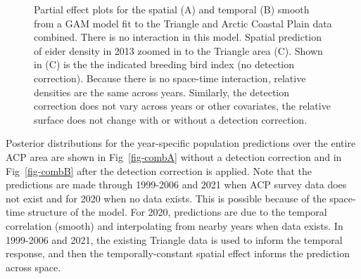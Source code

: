 \documentclass[
  10pt,
  letterpaper,
]{article}
\begin{document}
\begin{figure}

\begin{minipage}{0.50\linewidth}

\subcaption{\label{fig-combPart}}

\end{minipage}%
%
\begin{minipage}{0.50\linewidth}

\subcaption{\label{fig-temp}}

\end{minipage}%
\newline
\begin{minipage}{\linewidth}

\subcaption{\label{fig-combZoom}}

\end{minipage}%

\caption{\label{fig-mapComb}Partial effect plots for the spatial (A) and
temporal (B) smooth from a GAM model fit to the Triangle and Arctic
Coastal Plain data combined. There is no interaction in this model.
Spatial prediction of eider density in 2013 zoomed in to the Triangle
area (C). Shown in (C) is the the indicated breeding bird index (no
detection correction). Because there is no space-time interaction,
relative densities are the same across years. Similarly, the detection
correction does not vary across years or other covariates, the relative
surface does not change with or without a detection correction.}

\end{figure}%

Posterior distributions for the year-specific population predictions
over the entire ACP area are shown in Fig~\ref{fig-combA} without a
detection correction and in Fig~\ref{fig-combB} after the detection
correction is applied. Note that the predictions are made through
1999-2006 and 2021 when ACP survey data does not exist and for 2020 when
no data exists. This is possible because of the space-time structure of
the model. For 2020, predictions are due to the temporal correlation
(smooth) and interpolating from nearby years when data exists. In
1999-2006 and 2021, the existing Triangle data is used to inform the
temporal response, and then the temporally-constant spatial effect
informs the prediction across space.
\end{document}
